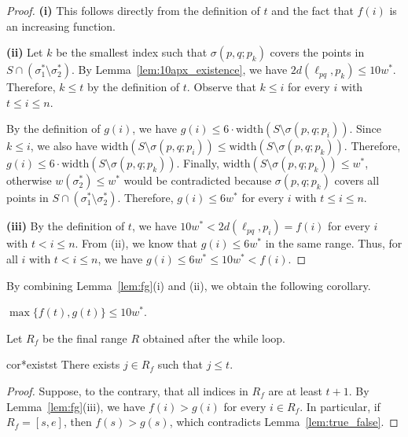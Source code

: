 \documentclass[english,a4paper, cleveref, autoref, thm-restate, nolineno]{socg-lipics-v2021}
\theoremstyle{star}
\theoremstyle{claimstar}
\newcommand{\width}{\ensuremath{\mathrm{width}}}
\begin{document}
\begin{proof}
    \textbf{\textsf{(i)}} This follows directly from the definition of $t$ and the fact that $f(i)$ is an increasing function.

    \textbf{\textsf{(ii)}}  Let $k$ be the smallest index such that $\sigma(p, q; p_k)$ covers the points in $S\cap (\sigma_1^* \setminus \sigma_2^*)$. 
    By Lemma~\ref{lem:10apx_existence}, we have $2d(\ell_{pq}, p_k) \le 10w^*$. 
    Therefore, $k\le t$ by the definition of $t$. 
    Observe that $k \le i$ for every $i$ with $t\le i\le n$. 

    By the definition of $g(i)$, we have $g(i) \le 6\cdot \width(S \setminus \sigma(p, q; p_i))$.
    Since $k \le i$, we also have $\width(S\setminus \sigma(p,q;p_{i})) \le \width(S\setminus \sigma(p,q;p_{k})) $.
    Therefore, $g(i) \le 6\cdot \width(S \setminus \sigma(p, q; p_k))$.
    Finally, $\width(S \setminus \sigma(p, q; p_k)) \le w^*$, otherwise $w(\sigma_2^*) \le w^*$ would be contradicted because $\sigma(p, q; p_k)$ covers all points in $S \cap (\sigma_1^* \setminus \sigma_2^*)$.
    Therefore, $g(i) \le 6 w^*$ for every $i$ with $t \le i \le n$.
    
    \textbf{\textsf{(iii)}}  By the definition of $t$, we have  $10w^* < 2d(\ell_{pq}, p_i) = f(i)$ for every $i$ with $t < i \le n$. 
    From {\textsf{(ii)}}, we know that $g(i) \le 6 w^*$ in the same range.
    Thus, for all $i$ with $t < i \le n$, we have $g(i) \le 6w^* \le 10w^* < f(i)$. 
\end{proof}


By combining Lemma~\ref{lem:fg}(i) and (ii), we obtain the following corollary. 


\begin{corollary}
    \label{cor:fgt}
    $\max \{f(t) , g(t)\} \le 10w^*$.
\end{corollary}


Let $R_f$ be the final range $R$ obtained after the while loop. 

\begin{restatable}{cor*}{existst}
    \label{cor:exists_t}
    There exists $j\in R_f$ such that $j \le t$. 
\end{restatable}


\begin{proof}
Suppose, to the contrary, that all indices in $R_f$ are at least $t+1$. 
By Lemma~\ref{lem:fg}(iii), we have $f(i) > g(i)$ for every $i \in R_f$.
In particular, if $R_f = [s, e]$, then $f(s) > g(s)$, which contradicts Lemma~\ref{lem:true_false}.
\end{proof}
\end{document}
